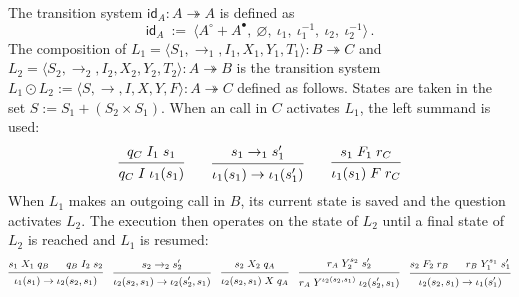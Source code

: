 \documentclass[acmsmall,screen,review,anonymous]{acmart}
\newcommand{\kw}[1]{\ensuremath{ \mathsf{#1} }}
\newcommand{\que}{\circ}
\newcommand{\ans}{\bullet}
\begin{document}
\begin{definition} \label{def:lcomp} %
The transition system
$\kw{id}_A : A \twoheadrightarrow A$
is defined as
\[
  \kw{id}_A \::=\:
  \big\langle
    A^\que + A^\ans, \:
    \varnothing, \:
    \iota_1, \:
    \iota_1^{-1}, \:
    \iota_2, \:
    \iota_2^{-1}
  \big\rangle
  \,.
\]
The composition of
$
  L_1 = \langle S_1, {\rightarrow_1}, I_1, X_1, Y_1, T_1 \rangle
    : B \twoheadrightarrow C
$ and $
  L_2 = \langle S_2, {\rightarrow_2}, I_2, X_2, Y_2, T_2 \rangle
    : A \twoheadrightarrow B
$
is the transition system
$
  L_1 \odot L_2 :=
  \langle S, {\rightarrow}, I, X, Y, F \rangle
  : A \twoheadrightarrow C
$ defined as follows.
States are taken in the set
$
    S := S_1 + (S_2 \times S_1)
$.
When an call in $C$ activates $L_1$,
the left summand is used:
\[
  \begin{prooftree}
    \hypo{q_C \mathrel{I_1} s_1}
    \infer1{q_C \mathrel{I} \iota_1(s_1)}
  \end{prooftree}
  \qquad
  \begin{prooftree}
    \hypo{s_1 \rightarrow_1 s_1'}
    \infer1{\iota_1(s_1) \rightarrow \iota_1(s_1')}
  \end{prooftree}
  \qquad
  \begin{prooftree}
    \hypo{s_1 \mathrel{F_1} r_C}
    \infer1{\iota_1(s_1) \mathrel{F} r_C}
  \end{prooftree}
\]
When $L_1$ makes an outgoing call in $B$,
its current state is saved and
the question activates $L_2$.
The execution then
operates on the state of $L_2$
until a final state of $L_2$ is reached
and $L_1$ is resumed:
\[
  \small
  \begin{prooftree}
    \hypo{s_1 \mathrel{X_1} q_B}
    \hypo{q_B \mathrel{I_2} s_2}
    \infer2{\iota_1(s_1) \rightarrow \iota_2(s_2, s_1)}
  \end{prooftree}
  \quad
  \begin{prooftree}
    \hypo{s_2 \rightarrow_2 s_2'}
    \infer1{\iota_2(s_2, s_1) \rightarrow \iota_2(s_2', s_1)}
  \end{prooftree}
  \quad
  \begin{prooftree}
    \hypo{s_2 \mathrel{X_2} q_A}
    \infer1{\iota_2(s_2, s_1) \mathrel{X} q_A}
  \end{prooftree}
  \quad
  \begin{prooftree}
    \hypo{r_A \mathrel{Y_2^{s_2}} s_2'}
    \infer1{r_A \mathrel{Y^{\iota_2(s_2, s_1)}} \iota_2(s_2', s_1)}
  \end{prooftree}
  \quad
  \begin{prooftree}
    \hypo{s_2 \mathrel{F_2} r_B}
    \hypo{r_B \mathrel{Y_1^{s_1}} s_1'}
    \infer2{\iota_2(s_2, s_1) \rightarrow \iota_1(s_1')}
  \end{prooftree}
\]
\end{definition}
\end{document}
